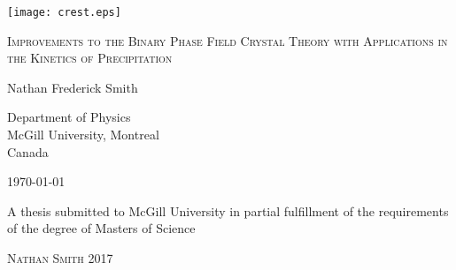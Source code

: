 
\begin{titlepage}
    \begin{center}
        
        \texttt{[image: crest.eps]}\par
       
        \vspace{1cm}

        {\Large \textsc{ 
            Improvements to the Binary Phase Field Crystal Theory
            with Applications in the Kinetics of Precipitation
        }\par}
       
        \vfill

        {\Large 
            Nathan Frederick Smith\par
        }
      
        \vspace{5mm}

        {\large 
            Department of Physics \\
            McGill University, Montreal \\
            Canada
        }

        \vspace{5mm} 

        {\large \today\par}
        
        \vspace{1cm}

        {\large
            A thesis submitted to McGill University in partial fulfillment 
            of the requirements of the degree of Masters of Science\par
        }
       
        \vspace{1cm}

        {\textcopyright \hspace{1mm} \textsc{Nathan Smith 2017}\par}
   
    \end{center}
\end{titlepage}

